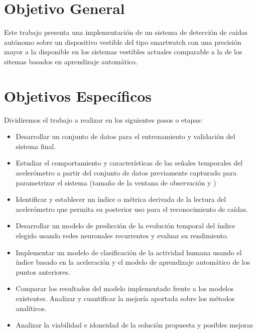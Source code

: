 \documentclass[../tfm.tex]{subfiles}
\begin{document}



\section{Objetivo General}

Este trabajo presenta una implementación de un sistema de detección de caídas autónomo sobre un dispositivo vestible del tipo smartwatch con una precisión mayor a la disponible en los sistemas vestibles actuales comparable a la de los sitemas basados en aprendizaje automático.

\section{Objetivos Específicos}

Dividiremos el trabajo a realizar en los siguientes pasos o etapas:
\begin{itemize}
  \item Desarrollar un conjunto de datos para el entrenamiento y validación del sistema final.
  \item Estudiar el comportamiento y características de las señales temporales del acelerómetro a partir del conjunto de datos previamente capturado para parametrizar el sistema (tamaño de la ventana de observación y )
  \item Identificar y establecer un índice o métrica derivada de la lectura del acelerómetro que permita su posterior uso para el reconocimiento de caídas.
  \item Desarrollar un modelo de predicción de la evolución temporal del índice elegido usando redes neuronales recurrentes y evaluar su rendimiento.
  \item Implementar un modelo de clasificación de la actividad humana usando el índice basado en la aceleración y el modelo de aprendizaje automático de los puntos anteriores.
  \item Comparar los resultados del modelo implementado frente a los modelos existentes. Analizar y cuantificar la mejoría aportada sobre los métodos analíticos.
  \item Analizar la viabilidad e idoneidad de la solución propuesta y posibles mejoras
\end{itemize}
\end{document}

